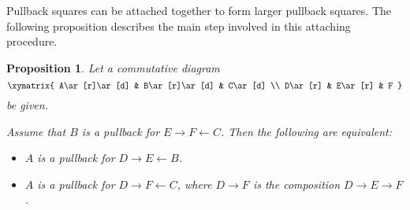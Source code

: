 \documentclass[12pt]{article}
\newtheorem*{proposition*}{Proposition}
\newcommand{\from}{\leftarrow}
\begin{document}
Pullback squares can be attached together to form larger pullback
squares.  The following proposition describes the main step involved
in this attaching procedure.

\begin{proposition*}
Let a commutative diagram
\[\xymatrix{
A\ar[r]\ar[d] & B\ar[r]\ar[d] & C\ar[d] \\
D\ar[r]       & E\ar[r]       & F
}\]
be given.

Assume that $B$ is a pullback for $E\to F\from C$.  Then the following
are equivalent:

\begin{itemize}
\item
$A$ is a pullback for $D\to E\from B$.

\item
$A$ is a pullback for $D\to F\from C$, where $D\to F$ is the composition $D\to E\to F$.
\end{itemize}
\end{proposition*}
\end{document}

